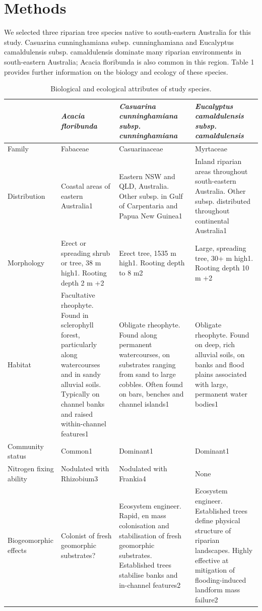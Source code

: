 \documentclass[12pt,a4paper]{memoir}
\begin{document}
\section{Methods}
We selected three riparian tree species native to south-eastern Australia for this study. Casuarina cunninghamiana subsp. cunninghamiana and Eucalyptus camaldulensis subsp. camaldulensis dominate many riparian environments in south-eastern Australia; Acacia floribunda is also common in this region. Table 1 provides further information on the biology and ecology of these species.

\begin{table}[]
\tiny
\centering
\caption[Biological and ecological attributes of study species.]{\small{Biological and ecological attributes of study species.}}
\label{Ch5_T1}
\begin{tabular}{p{3cm}p{3cm}p{3cm}p{3cm}}
\hline
 & {\textit{Acacia floribunda}} & {\textit{Casuarina cunninghamiana subsp. cunninghamiana}} & {\textit{Eucalyptus camaldulensis subsp. camaldulensis}} \\ \hline
Family & Fabaceae & Casuarinaceae & Myrtaceae \\ \hline
Distribution & Coastal areas of eastern Australia1 & Eastern NSW and QLD, Australia. Other subsp. in Gulf of Carpentaria and Papua New Guinea1 & Inland riparian areas throughout south-eastern Australia. Other subsp. distributed throughout continental Australia1 \\ \hline
Morphology & Erect or spreading shrub or tree, 38 m high1. Rooting depth 2 m +2 & Erect tree, 1535 m high1. Rooting depth to 8 m2 & Large, spreading tree, 30+ m high1. Rooting depth 10 m +2 \\ \hline
Habitat & Facultative rheophyte. Found in sclerophyll forest, particularly along watercourses and in sandy alluvial soils. Typically on channel banks and raised within-channel features1 & Obligate rheophyte. Found along permanent watercourses, on substrates ranging from sand to large cobbles. Often found on bars, benches and channel islands1 & Obligate rheophyte. Found on deep, rich alluvial soils, on banks and flood plains associated with large, permanent water bodies1 \\ \hline
Community status & Common1 & Dominant1 & Dominant1 \\ \hline
Nitrogen fixing ability & Nodulated with Rhizobium3 & Nodulated with Frankia4 & None \\ \hline
Biogeomorphic effects & Colonist of fresh geomorphic substrates? & Ecosystem engineer. Rapid, en mass colonisation and stabilisation of fresh geomorphic substrates. Established trees stabilise banks and in-channel features2 & Ecosystem engineer. Established trees define physical structure of riparian landscapes. Highly effective at mitigation of flooding-induced landform mass failure2 \\ \hline
\end{tabular}
\end{table}
\end{document}
